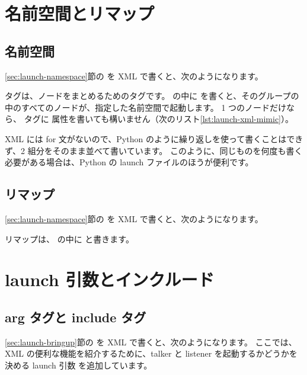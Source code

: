 \section{名前空間とリマップ}
\label{sec:launch-xml-namespace}

\subsection{名前空間}

\ref{sec:launch-namespace}節の  を XML で書くと、次のようになります。


 タグは、ノードをまとめるためのタグです。
 の中に  を書くと、そのグループの中のすべてのノードが、指定した名前空間で起動します。
1 つのノードだけなら、 タグに  属性を書いても構いません（次のリスト\ref{lst:launch-xml-mimic}）。

XML には for 文がないので、Python のように繰り返しを使って書くことはできず、2 組分をそのまま並べて書いています。
このように、同じものを何度も書く必要がある場合は、Python の launch ファイルのほうが便利です。

\subsection{リマップ}

\ref{sec:launch-namespace}節の  を XML で書くと、次のようになります。


リマップは、 の中に  と書きます。

\section{launch 引数とインクルード}
\label{sec:launch-xml-bringup}

\subsection{arg タグと include タグ}

\ref{sec:launch-bringup}節の  を XML で書くと、次のようになります。
ここでは、XML の便利な機能を紹介するために、talker と listener を起動するかどうかを決める launch 引数  を追加しています。

